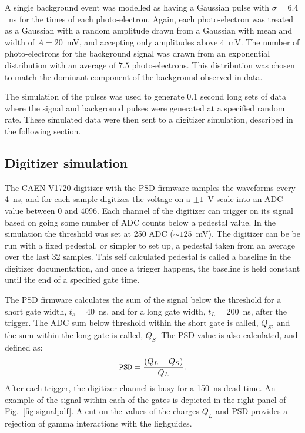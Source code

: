 \documentclass[review]{elsarticle}
\begin{document}
A single background event was modelled as having a Gaussian pulse with
$\sigma=6.4$~ns for the times of each photo-electron.  Again, each
photo-electron was treated as a Gaussian with a random amplitude drawn
from a Gaussian with mean and width of $A=20$~mV, and accepting only
amplitudes above 4~mV.  The number of photo-electrons for the
background signal was drawn from an exponential distribution with an
average of $7.5$ photo-electrons.  This distribution was chosen to match
the dominant component of the background observed in data.

The simulation of the pulses was used to generate 0.1 second long sets
of data where the signal and background pulses were generated at a
specified random rate.  These simulated data were then sent to a
digitizer simulation, described in the following section.


\subsection{ Digitizer simulation }
 
The CAEN V1720 digitizer with the PSD firmware samples the waveforms
every 4~ns, and for each sample digitizes the voltage on a $\pm 1$~V
scale into an ADC value between 0 and 4096.  Each channel of the
digitizer can trigger on its signal based on going some number of ADC
counts below a pedestal value.  In the simulation the threshold was
set at 250 ADC ($\sim 125$~mV).  The digitizer can be be run with a
fixed pedestal, or simpler to set up, a pedestal taken from an average
over the last 32 samples.  This self calculated pedestal is called a
baseline in the digitizer documentation, and once a trigger happens,
the baseline is held constant until the end of a specified gate time.

The PSD firmware calculates the sum of the signal below the threshold
for a short gate width, $t_s=40$~ns, and for a long gate width,
$t_L=200$~ns, after the trigger.  The ADC sum below threshold within
the short gate is called, $Q_S$, and the sum within the long gate is
called, $Q_S$.  The PSD value is also calculated, and defined as:
\begin{equation}
{\tt PSD} = \frac{ (Q_L - Q_S)} { Q_L }.
\end{equation}
After each trigger, the digitizer channel is busy for a 150~ns
dead-time.  An example of the signal within each of the gates is
depicted in the right panel of Fig.~\ref{fig:signalpdf}.  A cut on the
values of the charges $Q_L$ and PSD provides a rejection of gamma
interactions with the lighguides.
\end{document}
